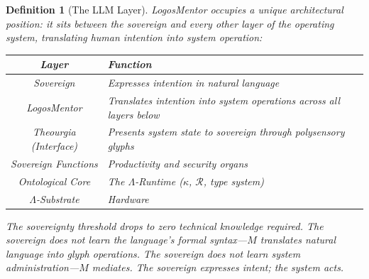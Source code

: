 \documentclass[12pt, letterpaper]{book}
\def\mathfrak#1{#1}%
\newtheorem{definition}{Definition}[chapter]
\begin{document}
\begin{definition}[The LLM Layer]\label{def:llm-layer}
LogosMentor occupies a unique architectural position: it sits between the sovereign and every other layer of the operating system, translating human intention into system operation:
\begin{center}
\small
\renewcommand{\arraystretch}{1.3}
\begin{tabular}{cp{8cm}}
\toprule
\textbf{Layer} & \textbf{Function} \\
\midrule
Sovereign & Expresses intention in natural language \\
\midrule
LogosMentor & Translates intention into system operations across all layers below \\
\midrule
Theourgia (Interface) & Presents system state to sovereign through polysensory glyphs \\
\midrule
Sovereign Functions & Productivity and security organs \\
\midrule
Ontological Core & The $\Lambda$-Runtime ($\kappa$, $\mathcal{R}$, type system) \\
\midrule
$\Lambda$-Substrate & Hardware \\
\bottomrule
\end{tabular}
\end{center}
The sovereignty threshold drops to zero technical knowledge required. The sovereign does not learn the language's formal syntax---$\mathfrak{M}$ translates natural language into glyph operations. The sovereign does not learn system administration---$\mathfrak{M}$ mediates. The sovereign expresses intent; the system acts.
\end{definition}
\end{document}
